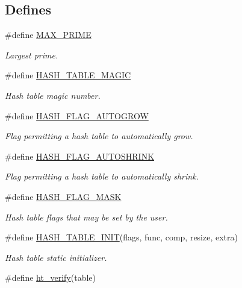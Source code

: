 \subsection*{Defines}
\begin{CompactItemize}
\item 
\#define \hyperlink{group__dbprim__hash_ga21}{MAX\_\-PRIME}
\begin{CompactList}\small\item\em Largest prime. \item\end{CompactList}\item 
\#define \hyperlink{group__dbprim__hash_ga22}{HASH\_\-TABLE\_\-MAGIC}
\begin{CompactList}\small\item\em Hash table magic number. \item\end{CompactList}\item 
\#define \hyperlink{group__dbprim__hash_ga23}{HASH\_\-FLAG\_\-AUTOGROW}
\begin{CompactList}\small\item\em Flag permitting a hash table to automatically grow. \item\end{CompactList}\item 
\#define \hyperlink{group__dbprim__hash_ga24}{HASH\_\-FLAG\_\-AUTOSHRINK}
\begin{CompactList}\small\item\em Flag permitting a hash table to automatically shrink. \item\end{CompactList}\item 
\#define \hyperlink{group__dbprim__hash_ga25}{HASH\_\-FLAG\_\-MASK}
\begin{CompactList}\small\item\em Hash table flags that may be set by the user. \item\end{CompactList}\item 
\#define \hyperlink{group__dbprim__hash_ga26}{HASH\_\-TABLE\_\-INIT}(flags, func, comp, resize, extra)
\begin{CompactList}\small\item\em Hash table static initializer. \item\end{CompactList}\item 
\#define \hyperlink{group__dbprim__hash_ga27}{ht\_\-verify}(table)

\end{CompactItemize}
